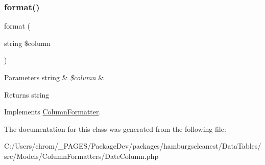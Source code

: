 \subsubsection{\texorpdfstring{format()}{format()}}
{\footnotesize\ttfamily format (\begin{DoxyParamCaption}\item[{string}]{\$column }\end{DoxyParamCaption})}


\begin{DoxyParams}[1]{Parameters}
string & {\em \$column} & \\
\hline
\end{DoxyParams}
\begin{DoxyReturn}{Returns}
string 
\end{DoxyReturn}


Implements \hyperlink{interfacehamburgscleanest_1_1_data_tables_1_1_interfaces_1_1_column_formatter_aba259f7ae8b25e70bd444020c04606e7}{Column\+Formatter}.



The documentation for this class was generated from the following file\+:\begin{DoxyCompactItemize}
\item 
C\+:/\+Users/chrom/\+\_\+\+P\+A\+G\+E\+S/\+Package\+Dev/packages/hamburgscleanest/\+Data\+Tables/src/\+Models/\+Column\+Formatters/Date\+Column.\+php\end{DoxyCompactItemize}
